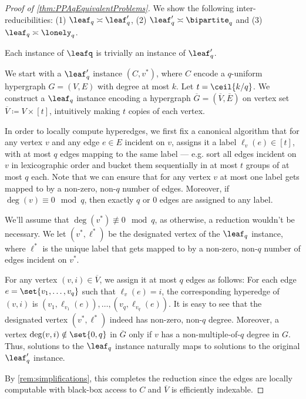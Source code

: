 \begin{proof}[Proof of \autoref{thm:PPAqEquivalentProblems}]
We show the following inter-reducibilities: (1) $\leaf_q \asymp \leaf_q'$, (2) $\leaf_q' \asymp \bipartite_q$ and (3) $\leaf_q \asymp \lonely_q$.

\medskip

 Each instance of $\leafq$ is trivially an instance of $\leaf'_q$.

\medskip

 We start with a $\leaf'_q$ instance $(C, v^*)$, where $C$ encode a $q$-uniform hypergraph $G = (V, E)$ with degree at most $k$. Let $t = \ceil{k/q}$. We construct a $\leaf_q$ instance encoding a hypergraph $\overline{G} = (\overline{V}, \overline{E})$ on vertex set $\overline{V}\coloneqq V \times [t]$, intuitively making $t$ copies of each vertex.

In order to locally compute hyperedges, we first fix a canonical algorithm that for any vertex $v$ and any edge $e \in E$ incident on $v$, assigns it a label $\ell_v(e) \in [t]$, with at most $q$ edges mapping to the same label --- e.g. sort all edges incident on $v$ in lexicographic order and bucket them sequentially in at most $t$ groups of at most $q$ each. Note that we can ensure that for any vertex $v$ at most one label gets mapped to by a non-zero, non-$q$ number of edges. Moreover, if $\deg(v) \equiv 0 \mod{q}$, then exactly $q$ or $0$ edges are assigned to any label.

We'll assume that $\deg(v^*) \not\equiv 0 \mod{q}$, as otherwise, a reduction wouldn't be necessary. We let $(v^*, \ell^*)$ be the designated vertex of the $\leaf_q$ instance, where $\ell^*$ is the unique label that gets mapped to by a non-zero, non-$q$ number of edges incident on $v^*$.

For any vertex $(v, i) \in \overline{V}$, we assign it at most $q$ edges as follows: For each edge $e = \set{v_1, \ldots, v_q}$ such that $\ell_v(e)=i$, the corresponding hyperedge of $(v,i)$ is ${(v_1, \ell_{v_1}(e)), \ldots, (v_q, \ell_{v_q}(e))}$. It is easy to see that the designated vertex $(v^*, \ell^*)$ indeed has non-zero, non-$q$ degree. Moreover, a vertex $\deg(v,i) \notin \set{0, q}$ in $\overline{G}$ only if $v$ has a non-multiple-of-$q$ degree in $G$. Thus, solutions to the $\leaf_q$ instance naturally maps to solutions to the original $\leaf_q'$ instance.

By \autoref{rem:simplifications}, this completes the reduction since the edges are locally computable with black-box access to $C$ and $\overline{V}$ is efficiently indexable.


\end{proof}
